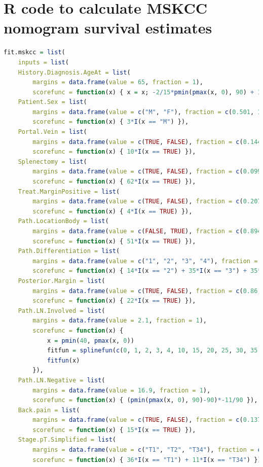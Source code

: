 \appendix
\appendixpage*
\addappheadtotoc

\chapter{R code to calculate \acrshort{MSKCC} nomogram survival estimates}
\label{app:nomo-mskcc-code}
\begin{lstlisting}[language=R]
fit.mskcc = list(
	inputs = list(
	History.Diagnosis.AgeAt = list(
		margins = data.frame(value = 65, fraction = 1),
		scorefunc = function(x) { x = x; -2/15*pmin(pmax(x, 0), 90) + 12 }),
	Patient.Sex = list(
		margins = data.frame(value = c("M", "F"), fraction = c(0.501, 1-0.501)),
		scorefunc = function(x) { 3*I(x == "M") }),
	Portal.Vein = list(
		margins = data.frame(value = c(TRUE, FALSE), fraction = c(0.144, 1-0.144)),
		scorefunc = function(x) { 10*I(x == TRUE) }),
	Splenectomy = list(
		margins = data.frame(value = c(TRUE, FALSE), fraction = c(0.099, 1-0.099)),
		scorefunc = function(x) { 62*I(x == TRUE) }),
	Treat.MarginPositive = list(
		margins = data.frame(value = c(TRUE, FALSE), fraction = c(0.207, 1-0.207)),
		scorefunc = function(x) { 4*I(x == TRUE) }),
	Path.LocationBody = list(
		margins = data.frame(value = c(FALSE, TRUE), fraction = c(0.894, 1-0.894)),
		scorefunc = function(x) { 51*I(x == TRUE) }),
	Path.Differentiation = list(
		margins = data.frame(value = c("1", "2", "3", "4"), fraction = c(0.142, 0.564, 1-0.142-0.564, 0)),
		scorefunc = function(x) { 14*I(x == "2") + 35*I(x == "3") + 35*I(x == "4") }),		# Undifferentiated (4) not covered by the MSKCC nomogram; here assign the same score as poorly differentiated (3)
	Posterior.Margin = list(
		margins = data.frame(value = c(TRUE, FALSE), fraction = c(0.86, 1-0.86)),
		scorefunc = function(x) { 22*I(x == TRUE) }),
	Path.LN.Involved = list(
		margins = data.frame(value = 2.1, fraction = 1),
		scorefunc = function(x) { 
			x = pmin(40, pmax(x, 0))
			fitfun = splinefun(c(0, 1, 2, 3, 4, 10, 15, 20, 25, 30, 35, 40), c(0, 14.56, 24.64, 30.28, 33.00, 39.05, 43.89, 48.83, 53.77, 58.61, 63.55, 68.49), method = "natural")
			fitfun(x)
		}),
	Path.LN.Negative = list(
		margins = data.frame(value = 16.9, fraction = 1),
		scorefunc = function(x) { (pmin(pmax(x, 0), 90)-90)*-11/90 }),
	Back.pain = list(
		margins = data.frame(value = c(TRUE, FALSE), fraction = c(0.137, 1-0.137)),
		scorefunc = function(x) { 15*I(x == TRUE) }),
	Stage.pT.Simplified = list(
		margins = data.frame(value = c("T1", "T2", "T34"), fraction = c(0.037, 0.119, 1-0.037-0.119)),
		scorefunc = function(x) { 36*I(x == "T1") + 11*I(x == "T34") }),

\end{lstlisting}

